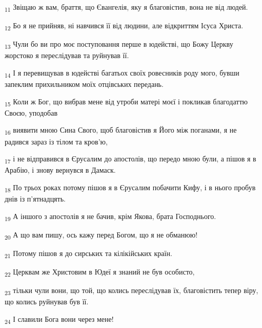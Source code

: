 \begin{tcolorbox}
\textsubscript{11} Звіщаю ж вам, браття, що Євангелія, яку я благовістив, вона не від людей.
\end{tcolorbox}
\begin{tcolorbox}
\textsubscript{12} Бо я не прийняв, ні навчився її від людини, але відкриттям Ісуса Христа.
\end{tcolorbox}
\begin{tcolorbox}
\textsubscript{13} Чули бо ви про моє поступовання перше в юдействі, що Божу Церкву жорстоко я переслідував та руйнував її.
\end{tcolorbox}
\begin{tcolorbox}
\textsubscript{14} І я перевищував в юдействі багатьох своїх ровесників роду мого, бувши запеклим прихильником моїх отцівських передань.
\end{tcolorbox}
\begin{tcolorbox}
\textsubscript{15} Коли ж Бог, що вибрав мене від утроби матері моєї і покликав благодаттю Своєю, уподобав
\end{tcolorbox}
\begin{tcolorbox}
\textsubscript{16} виявити мною Сина Свого, щоб благовістив я Його між поганами, я не радився зараз із тілом та кров'ю,
\end{tcolorbox}
\begin{tcolorbox}
\textsubscript{17} і не відправився в Єрусалим до апостолів, що передо мною були, а пішов я в Арабію, і знову вернувся в Дамаск.
\end{tcolorbox}
\begin{tcolorbox}
\textsubscript{18} По трьох роках потому пішов я в Єрусалим побачити Кифу, і в нього пробув днів із п'ятнадцять.
\end{tcolorbox}
\begin{tcolorbox}
\textsubscript{19} А іншого з апостолів я не бачив, крім Якова, брата Господнього.
\end{tcolorbox}
\begin{tcolorbox}
\textsubscript{20} А що вам пишу, ось кажу перед Богом, що я не обманюю!
\end{tcolorbox}
\begin{tcolorbox}
\textsubscript{21} Потому пішов я до сирських та кілікійських країн.
\end{tcolorbox}
\begin{tcolorbox}
\textsubscript{22} Церквам же Христовим в Юдеї я знаний не був особисто,
\end{tcolorbox}
\begin{tcolorbox}
\textsubscript{23} тільки чули вони, що той, що колись переслідував їх, благовістить тепер віру, що колись руйнував був її.
\end{tcolorbox}
\begin{tcolorbox}
\textsubscript{24} І славили Бога вони через мене!
\end{tcolorbox}
